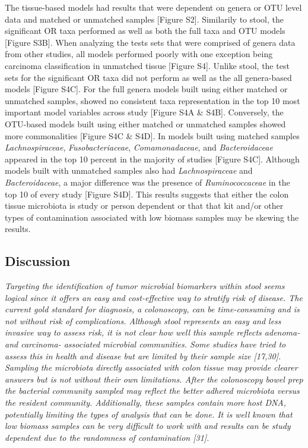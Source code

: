 \documentclass[12pt,]{article}
\begin{document}
The tissue-based models had results that were dependent on genera or OTU
level data and matched or unmatched samples {[}Figure S2{]}. Similarily
to stool, the significant OR taxa performed as well as both the full
taxa and OTU models {[}Figure S3B{]}. When analyzing the tests sets that
were comprised of genera data from other studies, all models performed
poorly with one exception being carcinoma classification in unmatched
tissue {[}Figure S4{]}. Unlike stool, the test sets for the significant
OR taxa did not perform as well as the all genera-based models {[}Figure
S4C{]}. For the full genera models built using either matched or
unmatched samples, showed no consistent taxa representation in the top
10 most important model variables across study {[}Figure S4A \& S4B{]}.
Conversely, the OTU-based models built using either matched or unmatched
samples showed more commonalities {[}Figure S4C \& S4D{]}. In models
built using matched samples \emph{Lachnospiraceae},
\emph{Fusobacteriaceae}, \emph{Comamonadaceae}, and
\emph{Bacteroidaceae} appeared in the top 10 percent in the majority of
studies {[}Figure S4C{]}. Although models built with unmatched samples
also had \emph{Lachnospiraceae} and \emph{Bacteroidaceae}, a major
difference was the presence of \emph{Ruminococcaceae} in the top 10 of
every study {[}Figure S4D{]}. This results suggests that either the
colon tissue microbiota is study or person dependent or that that kit
and/or other types of contamination associated with low biomass samples
may be skewing the results.

\newpage

\subsection{Discussion}\label{discussion}

\emph{Targeting the identification of tumor microbial biomarkers within
stool seems logical since it offers an easy and cost-effective way to
stratify risk of disease. The current gold standard for diagnosis, a
colonoscopy, can be time-consuming and is not without risk of
complications. Although stool represents an easy and less invasive way
to assess risk, it is not clear how well this sample reflects adenoma-
and carcinoma- associated microbial communities. Some studies have tried
to assess this in health and disease but are limited by their sample
size {[}17,30{]}. Sampling the microbiota directly associated with colon
tissue may provide clearer answers but is not without their own
limitations. After the colonoscopy bowel prep the bacterial community
sampled may reflect the better adhered microbiota versus the resident
community. Additionally, these samples contain more host DNA,
potentially limiting the types of analysis that can be done. It is well
known that low biomass samples can be very difficult to work with and
results can be study dependent due to the randomness of contamination
{[}31{]}.}
\end{document}
